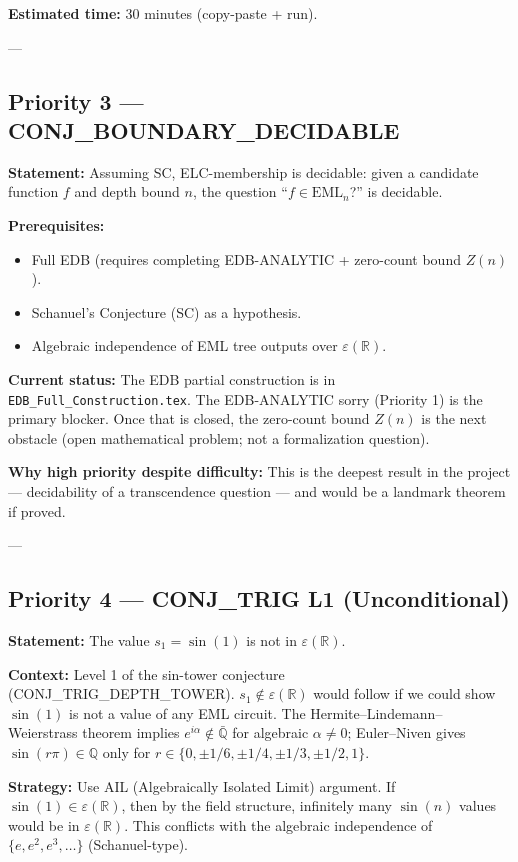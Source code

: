 \documentclass[12pt]{article}
\theoremstyle{definition}
\begin{document}
\textbf{Estimated time:} 30 minutes (copy-paste + run).

---

\subsection{Priority 3 — CONJ\_BOUNDARY\_DECIDABLE}

\textbf{Statement:} Assuming SC, ELC-membership is decidable: given a candidate
function $f$ and depth bound $n$, the question ``$f \in \mathrm{EML}_n$?'' is
decidable.

\textbf{Prerequisites:}
\begin{itemize}[noitemsep]
  \item Full EDB (requires completing EDB-ANALYTIC + zero-count bound $Z(n)$).
  \item Schanuel's Conjecture (SC) as a hypothesis.
  \item Algebraic independence of EML tree outputs over $\varepsilon(\mathbb{R})$.
\end{itemize}

\textbf{Current status:} The EDB partial construction is in
\texttt{EDB\_Full\_Construction.tex}.  The EDB-ANALYTIC sorry (Priority 1) is the
primary blocker.  Once that is closed, the zero-count bound $Z(n)$ is the next
obstacle (open mathematical problem; not a formalization question).

\textbf{Why high priority despite difficulty:} This is the deepest result in the
project — decidability of a transcendence question — and would be a landmark
theorem if proved.

---

\subsection{Priority 4 — CONJ\_TRIG L1 (Unconditional)}

\textbf{Statement:} The value $s_1 = \sin(1)$ is not in $\varepsilon(\mathbb{R})$.

\textbf{Context:} Level 1 of the sin-tower conjecture
(CONJ\_TRIG\_DEPTH\_TOWER).  $s_1 \notin \varepsilon(\mathbb{R})$ would follow if we
could show $\sin(1)$ is not a value of any EML circuit.  The Hermite–Lindemann–
Weierstrass theorem implies $e^{i\alpha} \notin \bar{\mathbb{Q}}$ for algebraic
$\alpha \neq 0$; Euler–Niven gives $\sin(r\pi) \in \mathbb{Q}$ only for $r \in
\{0, \pm 1/6, \pm 1/4, \pm 1/3, \pm 1/2, 1\}$.

\textbf{Strategy:} Use AIL (Algebraically Isolated Limit) argument.  If
$\sin(1) \in \varepsilon(\mathbb{R})$, then by the field structure, infinitely
many $\sin(n)$ values would be in $\varepsilon(\mathbb{R})$.  This conflicts with
the algebraic independence of $\{e, e^2, e^3, \ldots\}$ (Schanuel-type).
\end{document}
